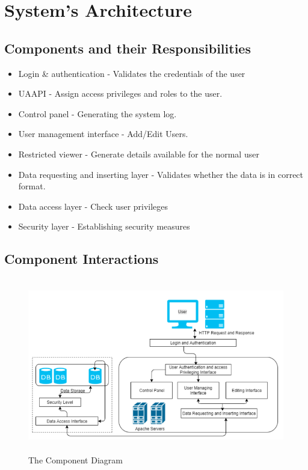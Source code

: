 \documentclass[a4paper,beamer]{article}
\begin{document}
	\newpage

	\section{System's Architecture}
	
	\subsection{Components and their Responsibilities}
	\begin{itemize}
		\item Login \& authentication - Validates the credentials of the user
		\item UAAPI - Assign access privileges and roles to the user.
		\item Control panel - Generating the system log.
		\item User management interface - Add/Edit Users.
		\item Restricted viewer - Generate details available for the normal user
		\item Data requesting and inserting layer - Validates whether the data is in correct format.
		\item Data access layer - Check user privileges
		\item Security layer - Establishing security measures
	\end{itemize}
	
	\subsection{Component Interactions}

	\begin{figure}[h!]
		\begin{center}
			\includegraphics[width=6in,height=3in]{img/component-diagram}
		\end{center}
		\caption{The Component Diagram}
		\label{fig:component}
	\end{figure}
	\vspace{2cm}
	
\end{document}
